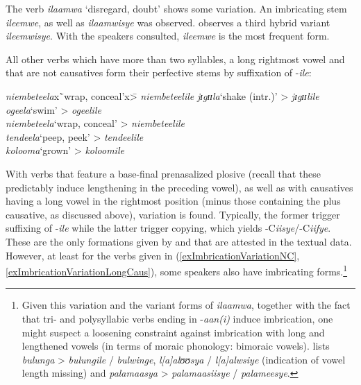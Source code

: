 The verb \textit{ilaamwa} \lq disregard, doubt' shows some variation. An imbricating stem \textit{ileemwe}, as well as \textit{ilaamwisye} was observed. \citet{BergerP1938} observes a third hybrid variant \textit{ileemwisye}. With the speakers consulted, \textit{ileemwe} is the most frequent form.

All other verbs which have more than two syllables, a long rightmost vowel and that are not causatives form their perfective stems by suffixation of -\textit{ile}: %
\begin{exe}
\ex \label{exLongVowelNoImbrication}
\begin{tabbing}
\textit{niembeteela}x\=`wrap, conceal'x\= > \textit{niembeteelile}\kill
\textit{jɪgɪɪla}\>`shake (intr.)'\> > \textit{jɪgɪɪlile}\\
\textit{ogeela}\>`swim'\> > \textit{ogeelile}\\
\textit{niembeteela}\>`wrap, conceal'\> > \textit{niembeteelile}\\
\textit{tendeela}\>`peep, peek'\> > \textit{tendeelile}\\
\textit{kolooma}\>`grown'\> > \textit{koloomile}
\end{tabbing}
\end{exe}

With verbs that feature a base-final prenasalized plosive (recall that these predictably induce lengthening in the preceding vowel), as well as with causatives having a long vowel in the rightmost position (minus those containing the  plus causative, as discussed above), variation is found. Typically, the former trigger suffixing of -\textit{ile} while the latter trigger copying, which yields \mbox{-C\textit{iisye}/}\mbox{-C\textit{iifye}}. These are the only formations given by \citet{SchumannK1899} and \citet{BergerP1938} that are attested in the textual data. However, at least for the verbs given in (\ref{exImbricationVariationNC}, \ref{exImbricationVariationLongCaus}), some speakers also have imbricating forms.\footnote{Given this variation and the variant forms of \textit{ilaamwa}, together with the fact that tri- and polysyllabic verbs ending in -\textit{aan(i)} induce imbrication, one might suspect a loosening constraint against imbrication with long and lengthened vowels (in terms of moraic phonology: bimoraic vowels). \citet{FelbergK1996} lists \textit{bulunga} > \textit{bulungile} / \textit{bulwinge}, \textit{l[a]alʊʊsya} / \textit{l[a]alwsiye} (indication of vowel length missing) and  \textit{palamaasya} > \textit{palamaasiisye} / \textit{palameesye}.}

